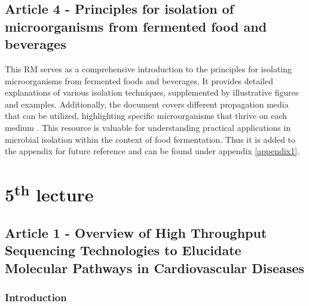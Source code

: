 \subsection{Article 4 - Principles for isolation of microorganisms from fermented food and beverages}
This RM serves as a comprehensive introduction to the principles for isolating microorganisms from fermented foods and beverages. It provides detailed explanations of various isolation techniques, supplemented by illustrative figures and examples. Additionally, the document covers different propagation media that can be utilized, highlighting specific microorganisms that thrive on each medium \cite*{L4-Isolation101}. This resource is valuable for understanding practical applications in microbial isolation within the context of food fermentation. Thus it is added to the appendix for future reference and can be found under appendix \ref*{appendix1}.

\section{5\texorpdfstring{\textsuperscript{th}}{th} lecture}
\subsection{Article 1 - Overview of High Throughput Sequencing Technologies to Elucidate Molecular Pathways in Cardiovascular Diseases}
\subsubsection*{Introduction}
